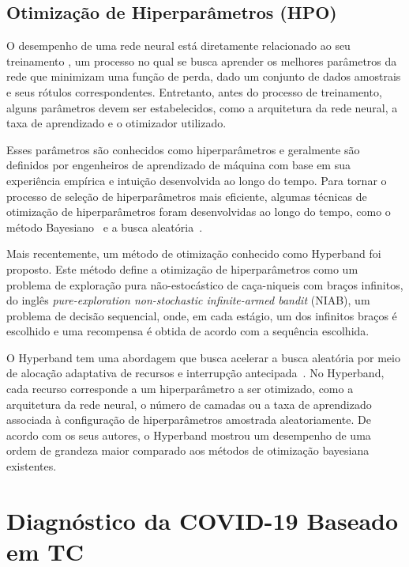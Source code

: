     
\subsection{Otimização de Hiperparâmetros (HPO)}\label{subsec:cap_fundamentos_hpo}

O desempenho de uma rede neural está diretamente relacionado ao seu treinamento \cite{riaz2020deep}, um processo no qual se busca aprender os melhores parâmetros da rede que minimizam uma função de perda, dado um conjunto de dados amostrais e seus rótulos correspondentes. Entretanto, antes do processo de treinamento, alguns parâmetros devem ser estabelecidos, como a arquitetura da rede neural, a taxa de aprendizado e o otimizador utilizado.

Esses parâmetros são conhecidos como hiperparâmetros e geralmente são definidos por engenheiros de aprendizado de máquina com base em sua experiência empírica e intuição \cite{choi2021active} desenvolvida ao longo do tempo. Para tornar o processo de seleção de hiperparâmetros mais eficiente, algumas técnicas de otimização de hiperparâmetros foram desenvolvidas ao longo do tempo, como o método Bayesiano~\cite{snoek2012practical} e a busca aleatória~\cite{bergstra2012random}.

Mais recentemente, um método de otimização conhecido como Hyperband \cite{Li2017} foi proposto. Este método define a otimização de hiperparâmetros como um problema de exploração pura não-estocástico de caça-niqueis com braços infinitos, do inglês \textit{pure-exploration non-stochastic infinite-armed bandit} (NIAB), um problema de decisão sequencial, onde, em cada estágio, um dos infinitos braços é escolhido e uma recompensa é obtida de acordo com a sequência escolhida.

O Hyperband tem uma abordagem que busca acelerar a busca aleatória por meio de alocação adaptativa de recursos e interrupção antecipada~\cite{Li2017}. No Hyperband, cada recurso corresponde a um hiperparâmetro a ser otimizado, como a arquitetura da rede neural, o número de camadas ou a taxa de aprendizado associada à configuração de hiperparâmetros amostrada aleatoriamente. De acordo com os seus autores, o Hyperband mostrou um desempenho de uma ordem de grandeza maior comparado aos métodos de otimização bayesiana existentes.

\section{Diagnóstico da COVID-19 Baseado em TC}\label{section:cap_fundamentos_diagnostico_covid}

